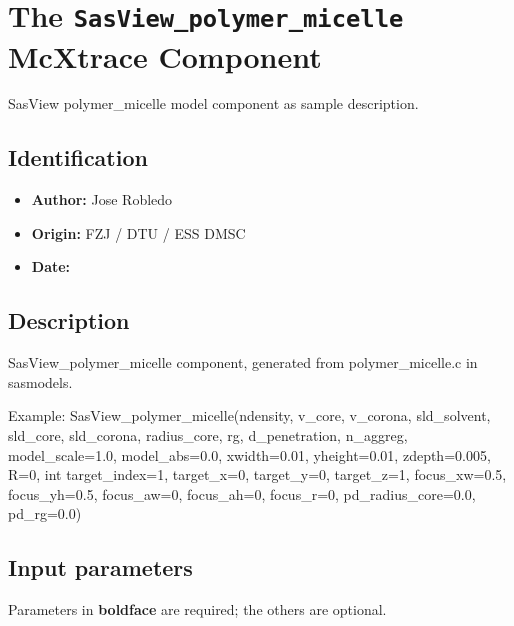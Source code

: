 \section{The \texttt{SasView\_polymer\_micelle} McXtrace Component}
SasView polymer\_micelle model component as sample description.

\subsection*{Identification}
\begin{itemize}
  \item \textbf{Author:} Jose Robledo
  \item \textbf{Origin:} FZJ / DTU / ESS DMSC
  \item \textbf{Date:} 
\end{itemize}

\subsection*{Description}
SasView\_polymer\_micelle component, generated from polymer\_micelle.c in sasmodels.

Example: SasView\_polymer\_micelle(ndensity, v\_core, v\_corona, sld\_solvent, sld\_core, sld\_corona, radius\_core, rg, d\_penetration, n\_aggreg, model\_scale=1.0, model\_abs=0.0, xwidth=0.01, yheight=0.01, zdepth=0.005, R=0, int target\_index=1, target\_x=0, target\_y=0, target\_z=1, focus\_xw=0.5, focus\_yh=0.5, focus\_aw=0, focus\_ah=0, focus\_r=0, pd\_radius\_core=0.0, pd\_rg=0.0)

\subsection*{Input parameters}
Parameters in \textbf{boldface} are required; the others are optional.

